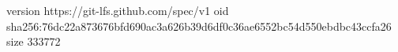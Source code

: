 version https://git-lfs.github.com/spec/v1
oid sha256:76dc22a873676bfd690ac3a626b39d6df0c36ae6552bc54d550ebdbc43ccfa26
size 333772
